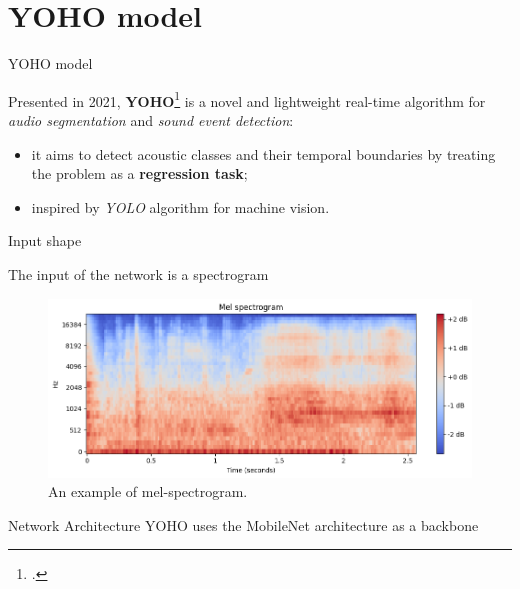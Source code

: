 

\section[YOHO model]{YOHO model}

	\begin{frame}{YOHO model}
			
		Presented in 2021, \textbf{YOHO}\footcite{Venkatesh_2022} is a novel and lightweight real-time algorithm for \textit{audio segmentation} and \textit{sound event detection}:
		\begin{itemize}
			\item it aims to detect acoustic classes and their temporal boundaries by treating the problem as a \textbf{regression task};
			\item inspired by \textit{YOLO} algorithm for machine vision.
		\end{itemize}
		
		\note{
			\dots			
		}		
		
	\end{frame}
	
	\begin{frame}{Input shape}
	
		The input of the network is a spectrogram
		\begin{figure}
			\centering
			\includegraphics[width=.75\textwidth]{images/spectrogram.png}

			\caption{An example of mel-spectrogram.}
			\label{fig:spectogram}
		\end{figure}
	
		
		\note{
			\dots
		}
	\end{frame}
	
	
	\begin{frame}{Network Architecture}
		YOHO uses the MobileNet architecture as a backbone 
		
		\note{
			\dots
		}
	\end{frame}
	
